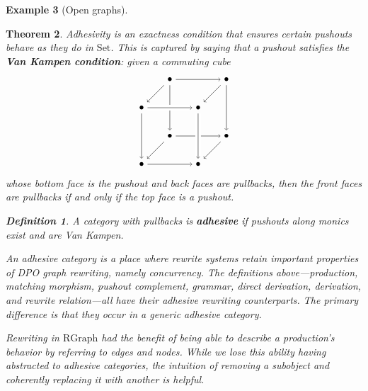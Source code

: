 \documentclass{amsart}
\newcommand{\Set}{\cat{Set}}
\newcommand{\RGraph}{\cat{RGraph}}
\newcommand{\defn}[1]{\textbf{#1}}
\newcommand{\cat}[1]{\mathrm{#1}}
\newtheorem{theorem}{Theorem}[section]
\theoremstyle{remark}
\theoremstyle{definition}
\newtheorem{example}[theorem]{Example}
\newtheorem{definition}[theorem]{Definition}
\begin{document}
\begin{example}[Open graphs]
{{\begin{theorem}
Adhesivity is an exactness condition that ensures certain pushouts
behave as they do in $ \Set $. This is captured by saying that a
pushout satisfies the \defn{Van Kampen condition}: given a commuting cube
%
\[
  \begin{tikzpicture}
    \node (1) at (1,3) {\( \bullet \)};
    \node (2) at (0,2) {\( \bullet \)};
    \node (3) at (3,3) {\( \bullet \)};
    \node (4) at (2,2) {\( \bullet \)};
    \node (5) at (1,1) {\( \bullet \)};
    \node (6) at (0,0) {\( \bullet \)};
    \node (7) at (3,1) {\( \bullet \)};
    \node (8) at (2,0) {\( \bullet \)};
    \draw [->] (1) to node [] {\scriptsize{\(  \)}} (5);
    \draw [->] (1) to node [] {\scriptsize{\(  \)}} (2);
    \draw [->] (1) to node [] {\scriptsize{\(  \)}} (3);
    \draw [white, line width=2mm] (2) -- (4);
    \draw [->] (2) to node [] {\scriptsize{\(  \)}} (4);
    \draw [->] (3) to node [] {\scriptsize{\(  \)}} (4);
    \draw [->] (5) to node [] {\scriptsize{\(  \)}} (6);
    \draw [->] (5) to node [] {\scriptsize{\(  \)}} (7);
    \draw [->] (6) to node [] {\scriptsize{\(  \)}} (8);
    \draw [->] (7) to node [] {\scriptsize{\(  \)}} (8);
    \draw [->] (2) to node [] {\scriptsize{\(  \)}} (6);
    \draw [->] (3) to node [] {\scriptsize{\(  \)}} (7);
    \draw [white, line width=2mm] (4) -- (8);
    \draw [->] (4) to node [] {\scriptsize{\(  \)}} (8);
  \end{tikzpicture}
\]
% 
whose bottom face is the pushout and back faces are pullbacks, then
the front faces are pullbacks if and only if the top face is a pushout.

\begin{definition} \label{dfn:adhesive-category} 
  A category with pullbacks is \defn{adhesive} if pushouts along
  monics exist and are Van Kampen.
\end{definition} 

An adhesive category is a place where rewrite systems retain important
properties of DPO graph rewriting, namely concurrency. The definitions
above---production, matching morphism, pushout complement, grammar,
direct derivation, derivation, and rewrite relation---all have their
adhesive rewriting counterparts.  The primary difference is that they
occur in a generic adhesive category.

Rewriting in $ \RGraph $ had the benefit of being able to describe a
production's behavior by referring to edges and nodes. While we lose
this ability having abstracted to adhesive categories, the intuition
of removing a subobject and coherently replacing it with another
is helpful.


\end{theorem}}}
\end{example}
\end{document}
